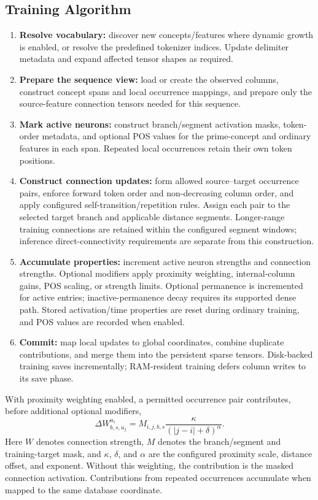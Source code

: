 \subsection{Training Algorithm}
\begin{enumerate}
	\item \textbf{Resolve vocabulary:} discover new concepts/features where dynamic growth is enabled, or resolve the predefined tokenizer indices. Update delimiter metadata and expand affected tensor shapes as required.
	\item \textbf{Prepare the sequence view:} load or create the observed columns, construct concept spans and local occurrence mappings, and prepare only the source-feature connection tensors needed for this sequence.
	\item \textbf{Mark active neurons:} construct branch/segment activation masks, token-order metadata, and optional POS values for the prime-concept and ordinary features in each span. Repeated local occurrences retain their own token positions.
	\item \textbf{Construct connection updates:} form allowed source--target occurrence pairs, enforce forward token order and non-decreasing column order, and apply configured self-transition/repetition rules. Assign each pair to the selected target branch and applicable distance segments. Longer-range training connections are retained within the configured segment windows; inference direct-connectivity requirements are separate from this construction.
	\item \textbf{Accumulate properties:} increment active neuron strengths and connection strengths. Optional modifiers apply proximity weighting, internal-column gains, POS scaling, or strength limits. Optional permanence is incremented for active entries; inactive-permanence decay requires its supported dense path. Stored activation/time properties are reset during ordinary training, and POS values are recorded when enabled.
	\item \textbf{Commit:} map local updates to global coordinates, combine duplicate contributions, and merge them into the persistent sparse tensors. Disk-backed training saves incrementally; RAM-resident training defers column writes to its save phase.
\end{enumerate}

With proximity weighting enabled, a permitted occurrence pair contributes, before additional optional modifiers,
\[
	\Delta W^{u_i}_{b,s,u_j}=M_{i,j,b,s}\frac{\kappa}{(|j-i|+\delta)^\alpha}.
\]
Here $W$ denotes connection strength, $M$ denotes the branch/segment and training-target mask, and $\kappa$, $\delta$, and $\alpha$ are the configured proximity scale, distance offset, and exponent. Without this weighting, the contribution is the masked connection activation. Contributions from repeated occurrences accumulate when mapped to the same database coordinate.

